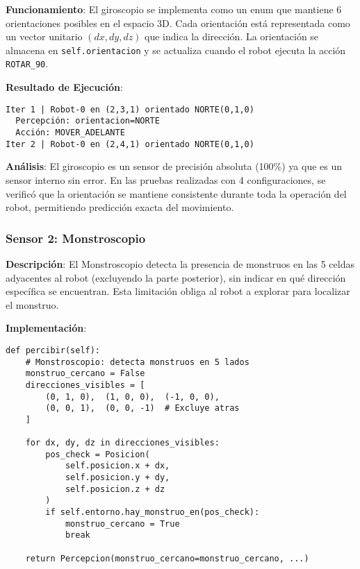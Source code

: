 \documentclass[10pt,twocolumn]{article}
\begin{document}
\textbf{Funcionamiento}: El giroscopio se implementa como un enum que mantiene 6 orientaciones posibles en el espacio 3D. Cada orientación está representada como un vector unitario $(dx, dy, dz)$ que indica la dirección. La orientación se almacena en \texttt{self.orientacion} y se actualiza cuando el robot ejecuta la acción \texttt{ROTAR\_90}.

\textbf{Resultado de Ejecución}:

\begin{verbatim}
Iter 1 | Robot-0 en (2,3,1) orientado NORTE(0,1,0)
  Percepción: orientacion=NORTE
  Acción: MOVER_ADELANTE
Iter 2 | Robot-0 en (2,4,1) orientado NORTE(0,1,0)
\end{verbatim}

\textbf{Análisis}: El giroscopio es un sensor de precisión absoluta (100\%) ya que es un sensor interno sin error. En las pruebas realizadas con 4 configuraciones, se verificó que la orientación se mantiene consistente durante toda la operación del robot, permitiendo predicción exacta del movimiento.

\subsubsection{Sensor 2: Monstroscopio}

\textbf{Descripción}: El Monstroscopio detecta la presencia de monstruos en las 5 celdas adyacentes al robot (excluyendo la parte posterior), sin indicar en qué dirección específica se encuentran. Esta limitación obliga al robot a explorar para localizar el monstruo.

\textbf{Implementación}:

\begin{lstlisting}[caption=Implementación del Monstroscopio]
def percibir(self):
    # Monstroscopio: detecta monstruos en 5 lados
    monstruo_cercano = False
    direcciones_visibles = [
        (0, 1, 0),  (1, 0, 0),  (-1, 0, 0),
        (0, 0, 1),  (0, 0, -1)  # Excluye atras
    ]
    
    for dx, dy, dz in direcciones_visibles:
        pos_check = Posicion(
            self.posicion.x + dx,
            self.posicion.y + dy,
            self.posicion.z + dz
        )
        if self.entorno.hay_monstruo_en(pos_check):
            monstruo_cercano = True
            break
    
    return Percepcion(monstruo_cercano=monstruo_cercano, ...)
\end{lstlisting}
\end{document}
